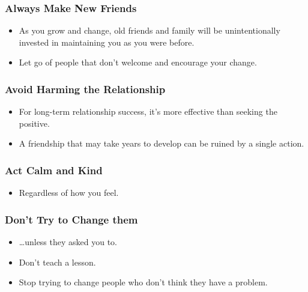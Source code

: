 \begin{frame}[fragile]\frametitle{Always Make New Friends}

\begin{itemize}
\item As you grow and change, old friends and family will be unintentionally invested in maintaining you as you were before.
\item Let go of people that don’t welcome and encourage your change.
\end{itemize}

\end{frame}

\begin{frame}[fragile]\frametitle{Avoid Harming the Relationship}

\begin{itemize}
\item For long-term relationship success, it’s more effective than seeking the positive.
\item A friendship that may take years to develop can be ruined by a single action.
\end{itemize}

\end{frame}

\begin{frame}[fragile]\frametitle{Act Calm and Kind}

\begin{itemize}
\item Regardless of how you feel.
\end{itemize}

\end{frame}

\begin{frame}[fragile]\frametitle{Don't Try to Change them}

\begin{itemize}
\item \ldots unless they asked you to.
\item Don’t teach a lesson.
\item Stop trying to change people who don’t think they have a problem.
\end{itemize}

\end{frame}

